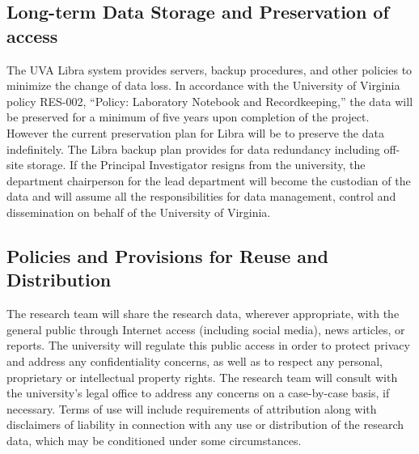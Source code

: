 \subsection*{Long-term Data Storage and Preservation of access}
The UVA Libra system provides servers, backup procedures, and other policies to minimize the change of data loss. In accordance with the University of Virginia policy RES-002, “Policy: Laboratory Notebook and Recordkeeping,” the data will be preserved for a minimum of five years upon completion of the project. However the current preservation plan for Libra will be to preserve the data indefinitely.  The Libra backup plan provides for data redundancy including off-site storage.  If the Principal Investigator resigns from the university, the department chairperson for the lead department will become the custodian of the data and will assume all the responsibilities for data management, control and dissemination on behalf of the University of Virginia.


\subsection*{Policies and Provisions for Reuse and Distribution }
The research team will share the research data, wherever appropriate, with the general public through Internet access (including social media), news articles, or reports. The university will regulate this public access in order to protect privacy and address any confidentiality concerns, as well as to respect any personal, proprietary or intellectual property rights. The research team will consult with the university’s legal office to address any concerns on a case-by-case basis, if necessary. Terms of use will include requirements of attribution along with disclaimers of liability in connection with any use or distribution of the research data, which may be conditioned under some circumstances.
